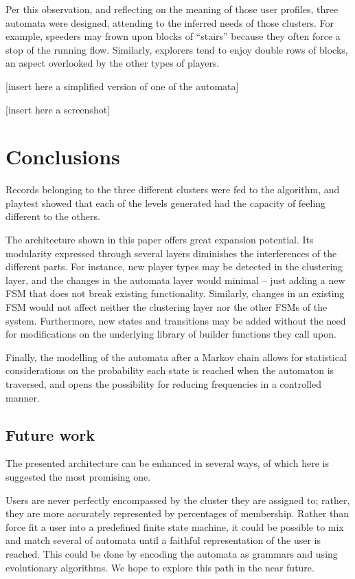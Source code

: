 \documentclass[conference]{IEEEtran}
\begin{document}
Per this observation, and reflecting on the meaning of those user profiles, three automata were designed, attending to the inferred needs of those clusters. For example, speeders may frown upon blocks of ``stairs'' because they often force a stop of the running flow. Similarly, explorers tend to enjoy double rows of blocks, an aspect overlooked by the other types of players. 

[insert here a simplified version of one of the automata]

[insert here a screenshot]

\section{Conclusions}

Records belonging to the three different clusters were fed to the algorithm, and playtest showed that each of the levels generated had the capacity of feeling different to the others.

The architecture shown in this paper offers great expansion potential. Its modularity expressed through several layers diminishes the interferences of the different parts. For instance, new player types may be detected in the clustering layer, and the changes in the automata layer would minimal -- just adding a new FSM that does not break existing functionality. Similarly, changes in an existing FSM would not affect neither the clustering layer nor the other FSMs of the system. Furthermore, new states and transitions may be added without the need for modifications on the underlying library of builder functions they call upon.

Finally, the modelling of the automata after a Markov chain allows for statistical considerations on the probability each state is reached when the automaton is traversed, and opens the possibility for reducing frequencies in a controlled manner.

\subsection*{Future work}

The presented architecture can be enhanced in several ways, of which here is suggested the most promising one.

Users are never perfectly encompassed by the cluster they are assigned to; rather, they are more accurately represented by percentages of membership. Rather than force fit a user into a predefined finite state machine, it could be possible to mix and match several of automata until a faithful representation of the user is reached. This could be done by encoding the automata as grammars and using evolutionary algorithms. We hope to explore this path in the near future.
\end{document}
